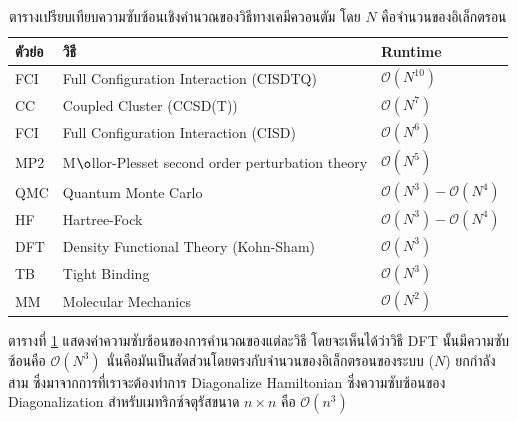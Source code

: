 \begin{table}[H]
    \centering
    \caption{ตารางเปรียบเทียบความซับซ้อนเชิงคำนวณของวิธีทางเคมีควอนตัม\cite{rupp2015} โดย $N$ คือจำนวนของอิเล็กตรอน}
    \label{tab:qm_complx}
    \small
    \begin{tabular}{lll}\toprule
    ตัวย่อ &วิธี &Runtime \\\midrule
    FCI &Full Configuration Interaction (CISDTQ) &$\mathcal{O}(N^{10})$ \\
    CC &Coupled Cluster (CCSD(T)) &$\mathcal{O}(N^{7})$ \\
    FCI &Full Configuration Interaction (CISD) &$\mathcal{O}(N^{6})$ \\
    MP2 &M$\o$llor-Plesset second order perturbation theory &$\mathcal{O}(N^{5})$ \\
    QMC &Quantum Monte Carlo &$\mathcal{O}(N^{3}) - \mathcal{O}(N^{4})$ \\
    HF &Hartree-Fock &$\mathcal{O}(N^{3}) - \mathcal{O}(N^{4})$ \\
    DFT &Density Functional Theory (Kohn-Sham) &$\mathcal{O}(N^{3})$ \\
    TB &Tight Binding &$\mathcal{O}(N^{3})$ \\
    MM &Molecular Mechanics &$\mathcal{O}(N^{2})$ \\
    \bottomrule
    \end{tabular}
\end{table}

ตารางที่ \ref{tab:qm_complx} แสดงค่าความซับซ้อนของการคำนวณของแต่ละวิธี โดยจะเห็นได้ว่าวิธี DFT นั้นมีความซับซ้อนคือ $\mathcal{O}(N^{3})$ 
นั่นคือมันเป็นสัดส่วนโดยตรงกับจำนวนของอิเล็กตรอนของระบบ ($N$) ยกกำลังสาม ซึ่งมาจากการที่เราจะต้องทำการ Diagonalize Hamiltonian 
ซึ่งความซับซ้อนของ Diagonalization สำหรับเมทริกซ์จตุรัสขนาด $n \times n$ คือ $\mathcal{O}(n^{3})$

